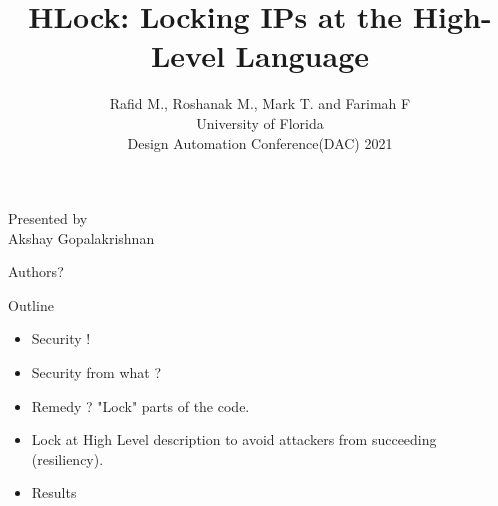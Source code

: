 \documentclass[xcolor=dvipsnames]{beamer}
\title{HLock: Locking IPs at the High-Level Language}
\subtitle{Rafid M., Roshanak M., Mark T. and Farimah F \\ University of Florida \\ Design Automation Conference(DAC) 2021}
\begin{document}
    
    \begin{frame}

        \maketitle

        Presented by \\ Akshay Gopalakrishnan

    \end{frame}

    \begin{frame}{Authors?}


        
    \end{frame}

    \begin{frame}{Outline}

        \begin{itemize}
            \item Security ! 
            \item Security from what ? 
            \item Remedy ? "Lock" parts of the code. 
            \item Lock at High Level description to avoid attackers from succeeding (resiliency).
            \item Results
        \end{itemize}
        
    \end{frame}
\end{document}
